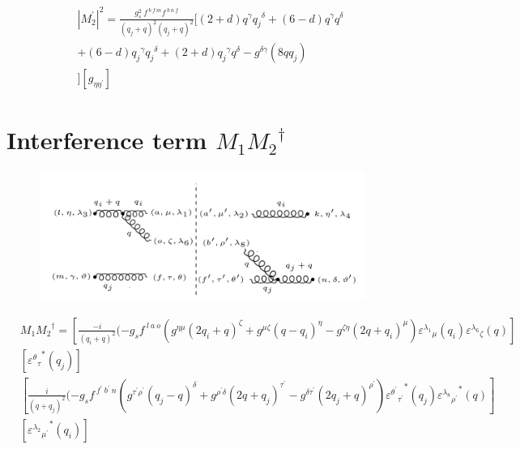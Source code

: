 \begin{equation}
\begin{split}
{|{M}^{\prime}_2|}^2 =\frac{g_s^2\: f^{\:b\:f\:m} f^{\:b\:n\:f}}{(q_j +q)^2 (q_j +q)^2}[(2+d)q^{\gamma}{q_j}^{\delta}+(6-d)q^{\gamma}{q}^{\delta}\\+(6-d){q_j}^{\gamma}{q_j}^{\delta}+(2+d){q_j}^{\gamma}{q}^{\delta}-g^{{\delta}{\gamma}}(8qq_j)\\
][g_{{\eta}{{\eta}^{\prime}}}]
\end{split}
\end{equation}

\section{Interference term $M_1 {M_2}^{\dagger}$}
\begin{figure}[h!]
\centering
\includegraphics[width=0.95\textwidth]{images/GG/M1M2Dagger.png}
\end{figure}

\begin{equation}
\begin{split}
&M_1{M_2}^{\dagger}=[\frac{-i}{(q_i +q)^2}(-g_s f^{\:l\:a\:o}(g^{{\eta}{\mu}}(2q_i+q)^{\zeta}+g^{{\mu}{\zeta}}(q -q_i)^{\eta}-g^{{\zeta}{\eta}}(2q +q_i)^{\mu}){\varepsilon^{\lambda_1}}_{\mu} (q_i) {\varepsilon^{\lambda_6}}_{\zeta}(q)]\\
&[{{\varepsilon^{\theta}}_{{\tau}}}^* (q_j)]\\
&[\frac{i}{(q +q_j)^2}(-g_s f^{\:f^{\prime}\:b^{\prime}\:n }(g^{{{\tau}^{\prime}}{{\rho}^{\prime}}}(q_j-q)^{{\delta}}+g^{{{\rho}^{\prime}}{{\delta}}}(2q +q_j)^{{\tau}^{\prime}}-g^{{{\delta}}{{\tau}^{\prime}}}(2q_j+q)^{{\rho}^{\prime}}){{\varepsilon^{{\theta}^{\prime}}}_{{\tau}^{\prime}}}^* (q_j){{\varepsilon^{\lambda_8}}_{{\rho}^{\prime}}}^* (q)]\\
&[{{\varepsilon^{\lambda_2}}_{{\mu}^{\prime}}}^* (q_i)]
\end{split}
\end{equation}


